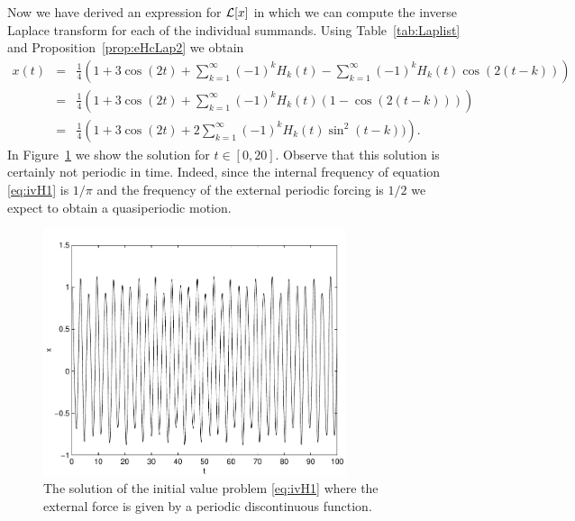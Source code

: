 \documentclass{ximera}
\begin{document}
Now we have derived an expression for ${\cal L}[x]$ in which we can compute the
inverse Laplace transform for each of the individual summands.  Using 
Table~\ref{tab:Laplist} and Proposition~\ref{prop:eHcLap2} we obtain
\begin{eqnarray*}
x(t)&=&\frac{1}{4}\left(1+3\cos(2t)+\sum_{k=1}^\infty (-1)^k H_k(t)
       -\sum_{k=1}^\infty (-1)^k H_k(t)\cos(2(t-k))\right)\\
&=&\frac{1}{4}\left(1+3\cos(2t)+\sum_{k=1}^\infty (-1)^k H_k(t)(1-\cos(2(t-k)))\right)\\
&=&\frac{1}{4}\left(1+3\cos(2t)+2\sum_{k=1}^\infty (-1)^k H_k(t)\sin^2(t-k))\right).
\end{eqnarray*}
In Figure~\ref{fig:lapperi} we show the solution for $t\in [0,20]$.  Observe 
that this solution is certainly not periodic in time.  Indeed, since the 
internal frequency of equation \eqref{eq:ivH1} is 
$1/\pi$ and the frequency of the external periodic forcing is $1/2$ we expect 
to obtain a quasiperiodic motion.
\begin{figure}[htb]
           \centerline{%
           \includegraphics[width=3.5in]{../figures/lapperi.pdf}}
           \caption{The solution of the initial value problem
	   \protect\eqref{eq:ivH1} where the external force is
   	   given by a periodic discontinuous function.}
           \label{fig:lapperi}
\end{figure}
\end{document}

